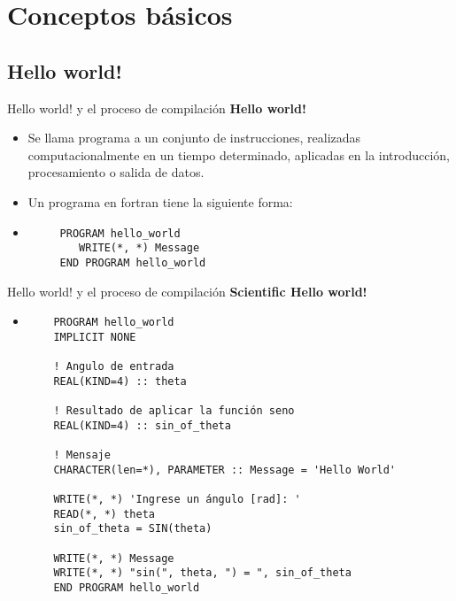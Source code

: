 \section{Conceptos básicos}




\subsection{Hello world!}
\begin{frame}[fragile]{Hello world! y el proceso de compilación}
 \textbf{Hello world!}
  \begin{itemize}[<+(1)->]
   \item Se llama programa a un conjunto de instrucciones, realizadas computacionalmente en un tiempo determinado, aplicadas en la introducción, procesamiento o salida de datos.   
   \item Un programa en fortran tiene la siguiente forma:
   \vspace{6pt}
   \item []
    \begin{verbatim}
     PROGRAM hello_world
        WRITE(*, *) Message
     END PROGRAM hello_world
    \end{verbatim}
  \end{itemize}
\end{frame}

\begin{frame}[fragile]{Hello world! y el proceso de compilación}
 \textbf{Scientific Hello world!}
  \begin{itemize}[<+(1)->]
   \vspace{6pt}
   \item []
    \begin{verbatim}
    PROGRAM hello_world
    IMPLICIT NONE

    ! Angulo de entrada
    REAL(KIND=4) :: theta
    
    ! Resultado de aplicar la función seno 
    REAL(KIND=4) :: sin_of_theta
    
    ! Mensaje
    CHARACTER(len=*), PARAMETER :: Message = 'Hello World'

    WRITE(*, *) 'Ingrese un ángulo [rad]: '
    READ(*, *) theta
    sin_of_theta = SIN(theta)
    
    WRITE(*, *) Message
    WRITE(*, *) "sin(", theta, ") = ", sin_of_theta
    END PROGRAM hello_world
    \end{verbatim}
  \end{itemize}
\end{frame}

